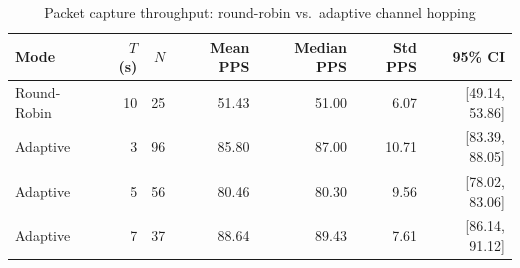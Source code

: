 \begin{table}[htbp]
\centering
\caption{Packet capture throughput: round-robin vs.\ adaptive channel hopping}
\label{tab:hopper-results}
\begin{tabular}{lrrrrrr}
\toprule
Mode & $T$ (s) & $N$ & Mean PPS & Median PPS & Std PPS & 95\% CI \\
\midrule
Round-Robin & 10 & 25 & 51.43 & 51.00 & 6.07 & [49.14, 53.86] \\
Adaptive & 3 & 96 & 85.80 & 87.00 & 10.71 & [83.39, 88.05] \\
Adaptive & 5 & 56 & 80.46 & 80.30 & 9.56 & [78.02, 83.06] \\
Adaptive & 7 & 37 & 88.64 & 89.43 & 7.61 & [86.14, 91.12] \\
\bottomrule
\end{tabular}
\end{table}